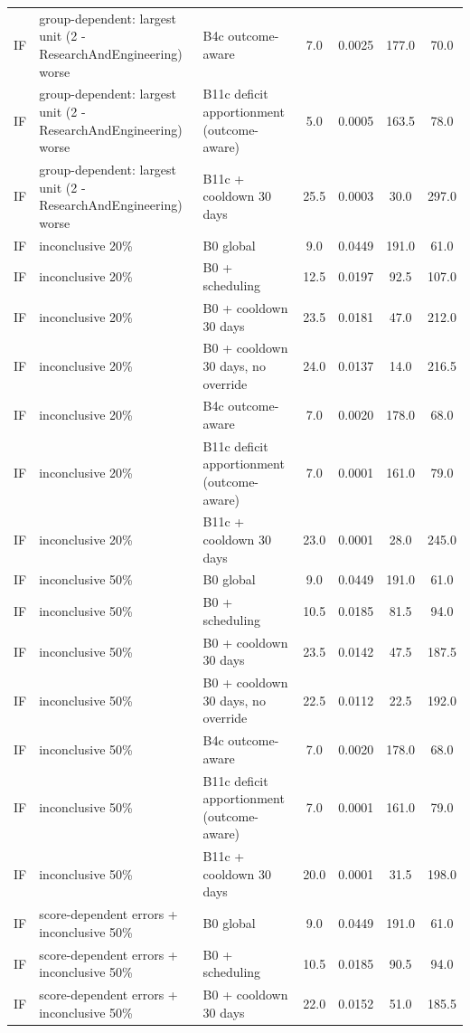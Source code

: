 \begin{longtable}{lp{5.2cm}p{4.4cm}cccc}
IF & group-dependent: largest unit (2 - ResearchAndEngineering) worse & B4c outcome-aware & 7.0 & 0.0025 & 177.0 & 70.0 \\
IF & group-dependent: largest unit (2 - ResearchAndEngineering) worse & B11c deficit apportionment (outcome-aware) & 5.0 & 0.0005 & 163.5 & 78.0 \\
IF & group-dependent: largest unit (2 - ResearchAndEngineering) worse & B11c + cooldown 30 days & 25.5 & 0.0003 & 30.0 & 297.0 \\
IF & inconclusive 20\% & B0 global & 9.0 & 0.0449 & 191.0 & 61.0 \\
IF & inconclusive 20\% & B0 + scheduling & 12.5 & 0.0197 & 92.5 & 107.0 \\
IF & inconclusive 20\% & B0 + cooldown 30 days & 23.5 & 0.0181 & 47.0 & 212.0 \\
IF & inconclusive 20\% & B0 + cooldown 30 days, no override & 24.0 & 0.0137 & 14.0 & 216.5 \\
IF & inconclusive 20\% & B4c outcome-aware & 7.0 & 0.0020 & 178.0 & 68.0 \\
IF & inconclusive 20\% & B11c deficit apportionment (outcome-aware) & 7.0 & 0.0001 & 161.0 & 79.0 \\
IF & inconclusive 20\% & B11c + cooldown 30 days & 23.0 & 0.0001 & 28.0 & 245.0 \\
IF & inconclusive 50\% & B0 global & 9.0 & 0.0449 & 191.0 & 61.0 \\
IF & inconclusive 50\% & B0 + scheduling & 10.5 & 0.0185 & 81.5 & 94.0 \\
IF & inconclusive 50\% & B0 + cooldown 30 days & 23.5 & 0.0142 & 47.5 & 187.5 \\
IF & inconclusive 50\% & B0 + cooldown 30 days, no override & 22.5 & 0.0112 & 22.5 & 192.0 \\
IF & inconclusive 50\% & B4c outcome-aware & 7.0 & 0.0020 & 178.0 & 68.0 \\
IF & inconclusive 50\% & B11c deficit apportionment (outcome-aware) & 7.0 & 0.0001 & 161.0 & 79.0 \\
IF & inconclusive 50\% & B11c + cooldown 30 days & 20.0 & 0.0001 & 31.5 & 198.0 \\
IF & score-dependent errors + inconclusive 50\% & B0 global & 9.0 & 0.0449 & 191.0 & 61.0 \\
IF & score-dependent errors + inconclusive 50\% & B0 + scheduling & 10.5 & 0.0185 & 90.5 & 94.0 \\
IF & score-dependent errors + inconclusive 50\% & B0 + cooldown 30 days & 22.0 & 0.0152 & 51.0 & 185.5 \\

\end{longtable}
